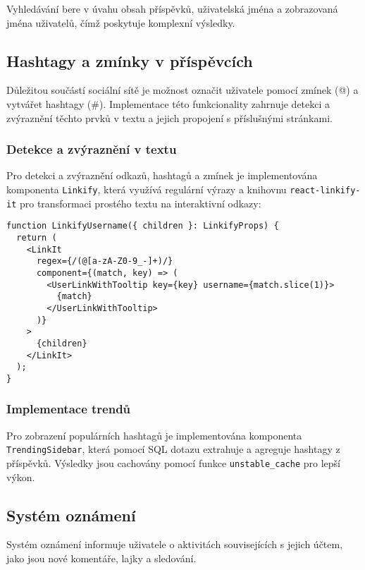 \documentclass[12pt]{article}
\begin{document}
Vyhledávání bere v úvahu obsah příspěvků, uživatelská jména a zobrazovaná jména uživatelů, čímž poskytuje komplexní výsledky.

\subsection{Hashtagy a zmínky v příspěvcích}

Důležitou součástí sociální sítě je možnost označit uživatele pomocí zmínek (@) a vytvářet hashtagy (\#). Implementace této funkcionality zahrnuje detekci a zvýraznění těchto prvků v textu a jejich propojení s příslušnými stránkami.

\subsubsection{Detekce a zvýraznění v textu}

Pro detekci a zvýraznění odkazů, hashtagů a zmínek je implementována komponenta \texttt{Linkify}, která využívá regulární výrazy a knihovnu \texttt{react-linkify-it} pro transformaci prostého textu na interaktivní odkazy:

\begin{lstlisting}[style=typescript]
function LinkifyUsername({ children }: LinkifyProps) {
  return (
    <LinkIt
      regex={/(@[a-zA-Z0-9_-]+)/}
      component={(match, key) => (
        <UserLinkWithTooltip key={key} username={match.slice(1)}>
          {match}
        </UserLinkWithTooltip>
      )}
    >
      {children}
    </LinkIt>
  );
}
\end{lstlisting}

\subsubsection{Implementace trendů}

Pro zobrazení populárních hashtagů je implementována komponenta \texttt{TrendingSidebar}, která pomocí SQL dotazu extrahuje a agreguje hashtagy z příspěvků. Výsledky jsou cachovány pomocí funkce \texttt{unstable\_cache} pro lepší výkon.

\newpage
\subsection{Systém oznámení}

Systém oznámení informuje uživatele o aktivitách souvisejících s jejich účtem, jako jsou nové komentáře, lajky a sledování. 
\end{document}
